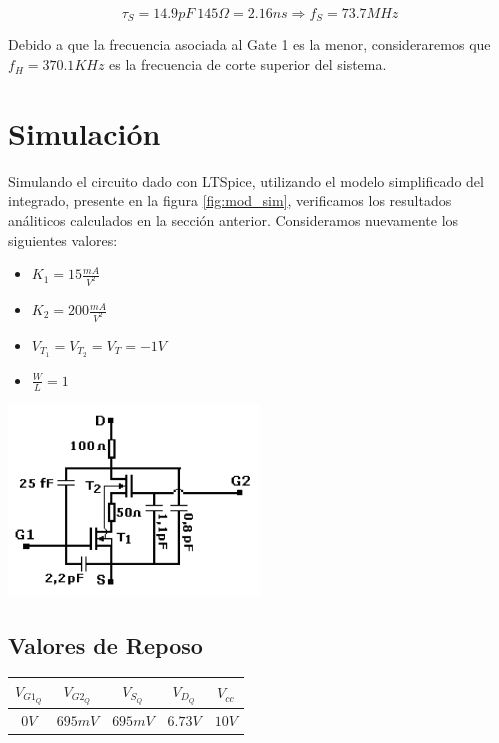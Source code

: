 \documentclass[a4paper, 10pt, spanish]{article}
\begin{document}
\begin{equation}
  \tau_{S} = 14.9 pF\ 145\Omega = 2.16ns \Rightarrow f_{S} = 73.7 MHz
\end{equation}

Debido a que la frecuencia asociada al Gate 1 es la menor, consideraremos que $f_H=370.1KHz$ es la frecuencia de corte superior del sistema.

\section{Simulación}
Simulando el circuito dado con LTSpice, utilizando el modelo simplificado del integrado, presente en la figura \ref{fig:mod_sim}, verificamos los resultados análiticos calculados en la sección anterior. Consideramos nuevamente los siguientes valores:
\begin{itemize}
  \item $K_1=15\frac{mA}{V^2}$
  \item $K_2=200\frac{mA}{V^2}$
  \item $V_{T_1}=V_{T_2}=V_{T}=-1V$
  \item $\frac{W}{L}=1$
\end{itemize}

\begin{center}
  \includegraphics[width=0.5\textwidth]{modelo_simple.png}
  \label{fig:mod_sim}
\end{center}

\subsection{Valores de Reposo}

\begin{center}
  \begin{tabular}{|c|c|c|c|c|}
    \hline
    $V_{G1_Q}$ & $V_{G2_Q}$ & $V_{S_Q}$ & $V_{D_Q}$ & $V_{cc}$ \\
    \hline
    $0V$ & $695mV$ & $695mV$ & $6.73V$ & $10V$ \\
    \hline
  \end{tabular}
  \label{tab:valores_reposo_sim}
\end{center}
\end{document}
